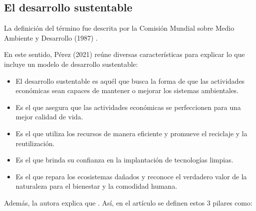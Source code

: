 \subsection{El desarrollo sustentable}

La definición del término fue descrita por la Comisión Mundial sobre Medio Ambiente y Desarrollo (1987) .

En este sentido, Pérez (2021) reúne diversas características para explicar lo que incluye un modelo de desarrollo sustentable:

\begin{itemize}
    \item El desarrollo sustentable es aquél que busca la forma de que las actividades económicas sean capaces de mantener o mejorar los sistemas ambientales.
    
    \item Es el que asegura que las actividades económicas se perfeccionen para una mejor calidad de vida.
    
    \item Es el que utiliza los recursos de manera eficiente y promueve el reciclaje y la reutilización.
    
    \item Es el que brinda su confianza en la implantación de tecnologías limpias.
    
    \item Es el que repara los ecosistemas dañados y reconoce el verdadero valor de la naturaleza para el bienestar y la comodidad humana.
\end{itemize}

Además, la autora explica que . Así, en el artículo se definen estos 3 pilares como:


